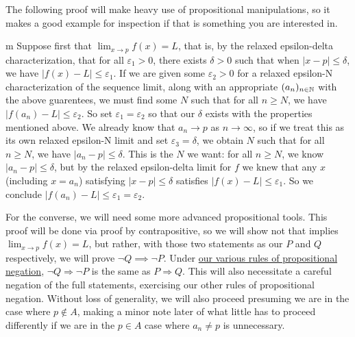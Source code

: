 \documentclass[11pt]{article}
\begin{document}
The following proof will make heavy use of propositional manipulations, so it makes a good example for inspection if that is something you are interested in.

\begin{my proof}{m}
Suppose first that $\lim_{x \to p} f(x) = L$, that is, by the relaxed epsilon-delta characterization, that for all $\varepsilon_1 > 0$, there exists $\delta> 0$ such that when $|x - p| \le \delta$, we have $|f(x) - L| \le \varepsilon_1$. If we are given some $\varepsilon_2 > 0$ for a relaxed epsilon-N characterization of the sequence limit, along with an appropriate $(a_n)_{n\in \mathbb{N}}$ with the above guarentees, we must find some $N$ such that for all $n \ge N$, we have $|f(a_n) - L| \le \varepsilon_2$. So set $\varepsilon_1 = \varepsilon_2$ so that our $\delta$ exists with the properties mentioned above. We already know that $a_n \to p$ as $n \to \infty$, so if we treat this as its own relaxed epsilon-N limit and set $\varepsilon_3 = \delta$, we obtain $N$ such that for all $n \ge N$, we have $|a_n - p| \le \delta$. This is the $N$ we want: for all $n \ge N$, we know $|a_n - p| \le \delta$, but by the relaxed epsilon-delta limit for $f$ we knew that any $x$ (including $x=a_n$) satisfying $|x - p| \le \delta$ satisfies $|f(x) - L| \le \varepsilon_1$. So we conclude $|f(a_n) - L| \le \varepsilon_1 = \varepsilon_2$.

For the converse, we will need some more advanced propositional tools. This proof will be done via proof by contrapositive, so we will show not that  implies $\lim_{x \to p} f(x) = L$, but rather, with those two statements as our $P$ and $Q$ respectively, we will prove $\neg Q \implies \neg P$. Under \hyperref[thm:PropNegationRules]{our various rules of propositional negation}, $\neg Q \Rightarrow \neg P$ is the same as $P \Rightarrow Q$. This will also necessitate a careful negation of the full statements, exercising our other rules of propositional negation. Without loss of generality, we will also proceed presuming we are in the case where $p \notin A$, making a minor note later of what little has to proceed differently if we are in the $p \in A$ case where $a_n \neq p$ is unnecessary.


\end{my proof}
\end{document}
